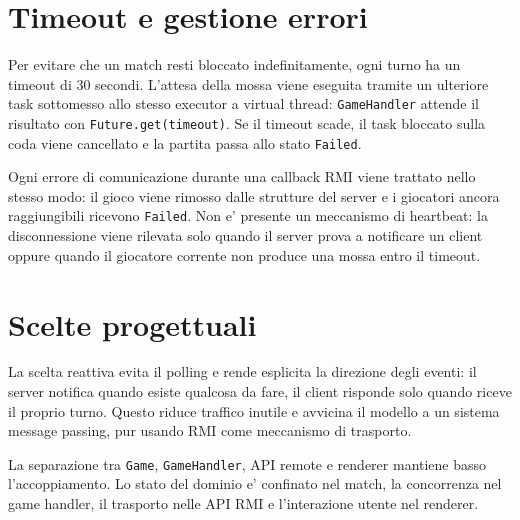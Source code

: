 \documentclass[a4paper,10pt]{article}
\begin{document}
\section{Timeout e gestione errori}
Per evitare che un match resti bloccato indefinitamente, ogni turno ha un
timeout di 30 secondi. L'attesa della mossa viene eseguita tramite un ulteriore
task sottomesso allo stesso executor a virtual thread:
\texttt{GameHandler} attende il risultato con \texttt{Future.get(timeout)}. Se
il timeout scade, il task bloccato sulla coda viene cancellato e la partita
passa allo stato \texttt{Failed}.

Ogni errore di comunicazione durante una callback RMI viene trattato nello stesso
modo: il gioco viene rimosso dalle strutture del server e i giocatori ancora
raggiungibili ricevono \texttt{Failed}. Non e' presente un meccanismo di
heartbeat: la disconnessione viene rilevata solo quando il server prova a
notificare un client oppure quando il giocatore corrente non produce una mossa
entro il timeout.

\section{Scelte progettuali}
La scelta reattiva evita il polling e rende esplicita la direzione degli eventi:
il server notifica quando esiste qualcosa da fare, il client risponde solo quando
riceve il proprio turno. Questo riduce traffico inutile e avvicina il modello a
un sistema message passing, pur usando RMI come meccanismo di trasporto.

La separazione tra \texttt{Game}, \texttt{GameHandler}, API remote e renderer
mantiene basso l'accoppiamento. Lo stato del dominio e' confinato nel match, la
concorrenza nel game handler, il trasporto nelle API RMI e l'interazione utente
nel renderer.
\end{document}
